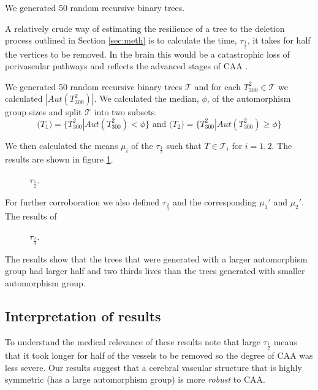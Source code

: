\documentclass[12pt]{article} %
\theoremstyle{definition}
\begin{document}
We generated 50 random recursive binary trees.

A relatively crude way of estimating the resilience of a tree to the deletion process outlined in Section \ref{sec:meth} is to calculate the time, $\tau_{\frac{1}{2}}$,  it takes for half the vertices to be removed.  In the brain this would be a catastrophic loss of perivascular pathways and reflects the advanced stages of CAA \cite{someone}.  

We generated 50 random recursive binary trees $\mathcal{T}$ and for each $T_{300}^{2} \in \mathcal{T}$ we calculated $|Aut(T_{300}^{2})|$.  We calculated the median, $\phi$, of the automorphism group sizes and split  $\mathcal{T}$  into two subsets.
\[\mathcal(T_{1}) = \{T_{300}^{2}  |Aut(T_{300}^{2}) < \phi\} \text{      and      } \mathcal(T_{2}) = \{T_{300}^{2}  |Aut(T_{300}^{2}) \geq \phi\} \]

We then calculated the means $\mu_{i}$ of the $\tau_{\frac{1}{2}}$ such that $T \in \mathcal{T}_{i}$ for $i= 1,2$. The results are shown in figure \ref{t12}.

\begin{figure}[H]

              \centering
                \caption{$\tau_{\frac{1}{2}}$.}\label{t12}
\end{figure}

For further corroboration we also defined $\tau_{\frac{2}{3}}$ and the corresponding $\mu_{1}'$ and $\mu_{2}'$.  The results of 

\begin{figure}[H]

              \centering
                \caption{$\tau_{\frac{2}{3}}$.}\label{t23}
\end{figure}

The results show that the trees that were generated with a larger automorphism group had larger half and two thirds lives than the trees generated with smaller automorphism group.  

\subsection{Interpretation of results}

To understand the medical relevance of these results note that large $\tau_{\frac{1}{2}}$ means that it took longer for half of the vessels to be removed so the degree of CAA was less severe.  Our results suggest that a cerebral vascular structure that is highly symmetric (has a large automorphism group) is more \emph{robust} to CAA.  
\end{document}
